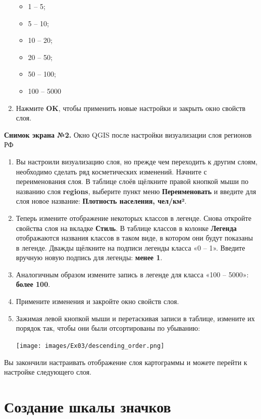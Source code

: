 \documentclass[
  12pt,
]{book}
\providecommand{\tightlist}{%
  \setlength{\itemsep}{0pt}\setlength{\parskip}{0pt}}
\begin{document}
\begin{enumerate}
  \begin{itemize}
  \tightlist
  \item
    1 -- 5;
  \item
    5 -- 10;
  \item
    10 -- 20;
  \item
    20 -- 50;
  \item
    50 -- 100;
  \item
    100 -- 5000
  \end{itemize}
\item
  Нажмите \textbf{OK}, чтобы применить новые настройки и закрыть окно свойств слоя.
\end{enumerate}

\textbf{Снимок экрана №2.} Окно QGIS после настройки визуализации слоя регионов РФ

\begin{enumerate}
\def\labelenumi{\arabic{enumi}.}
\setcounter{enumi}{14}
\item
  Вы настроили визуализацию слоя, но прежде чем переходить к другим слоям, необходимо сделать ряд косметических изменений. Начните с переименования слоя. В таблице слоёв щёлкните правой кнопкой мыши по названию слоя \textbf{regions}, выберите пункт меню \textbf{Переименовать} и введите для слоя новое название: \textbf{Плотность населения, чел/км²}.
\item
  Теперь измените отображение некоторых классов в легенде. Снова откройте свойства слоя на вкладке \textbf{Стиль}. В таблице классов в колонке \textbf{Легенда} отображаются названия классов в таком виде, в котором они будут показаны в легенде. Дважды щёлкните на подписи легенды класса «0 -- 1». Введите вручную новую подпись для легенды: \textbf{менее 1}.
\item
  Аналогичным образом измените запись в легенде для класса «100 -- 5000»: \textbf{более 100}.
\item
  Примените изменения и закройте окно свойств слоя.
\item
  Зажимая левой кнопкой мыши и перетаскивая записи в таблице, измените их порядок так, чтобы они были отсортированы по убыванию:

  \texttt{[image: images/Ex03/descending\_order.png]}
\end{enumerate}

Вы закончили настраивать отображение слоя картограммы и можете перейти к настройке следующего слоя.

\hypertarget{map-design-population-symbols}{%
\section{Создание шкалы значков}\label{map-design-population-symbols}}
\end{document}
